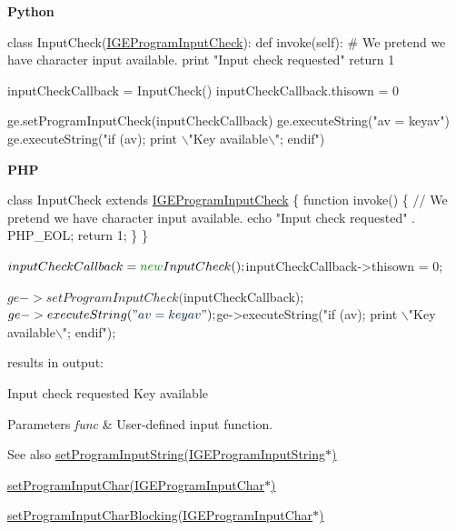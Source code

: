 {\bfseries Python} 
\begin{DoxyCode}
\textcolor{keyword}{class }InputCheck(\hyperlink{class_i_g_e_program_input_check}{IGEProgramInputCheck}):
    \textcolor{keyword}{def }invoke(self):
        \textcolor{comment}{# We pretend we have character input available.}
        \textcolor{keywordflow}{print} \textcolor{stringliteral}{"Input check requested"}
        \textcolor{keywordflow}{return} 1

inputCheckCallback = InputCheck()
inputCheckCallback.thisown = 0

ge.setProgramInputCheck(inputCheckCallback)
ge.executeString(\textcolor{stringliteral}{"av = keyav"})
ge.executeString(\textcolor{stringliteral}{"if (av); print \(\backslash\)"Key available\(\backslash\)"; endif"})
\end{DoxyCode}


{\bfseries P\+HP} 
\begin{DoxyCode}
\textcolor{keyword}{class }InputCheck \textcolor{keyword}{extends} \hyperlink{class_i_g_e_program_input_check}{IGEProgramInputCheck} \{
    \textcolor{keyword}{function} invoke() \{
        \textcolor{comment}{// We pretend we have character input available.}
        echo \textcolor{stringliteral}{"Input check requested"} . PHP\_EOL;
        \textcolor{keywordflow}{return} 1;
    \}
\}

$inputCheckCallback = \textcolor{keyword}{new} InputCheck();
$inputCheckCallback->thisown = 0;

$ge->setProgramInputCheck($inputCheckCallback);
$ge->executeString(\textcolor{stringliteral}{"av = keyav"});
$ge->executeString(\textcolor{stringliteral}{"if (av); print \(\backslash\)"Key available\(\backslash\)"; endif"});
\end{DoxyCode}
 results in output\+: 
\begin{DoxyCode}
Input check requested
Key available
\end{DoxyCode}



\begin{DoxyParams}{Parameters}
{\em func} & User-\/defined input function.\\
\hline
\end{DoxyParams}
\begin{DoxySeeAlso}{See also}
\hyperlink{class_g_a_u_s_s_ae82b5bfdf26971433c46936a812506c3}{set\+Program\+Input\+String(\+I\+G\+E\+Program\+Input\+String$\ast$)} 

\hyperlink{class_g_a_u_s_s_a71a60afb143ae00b18d6fe3fd99f316d}{set\+Program\+Input\+Char(\+I\+G\+E\+Program\+Input\+Char$\ast$)} 

\hyperlink{class_g_a_u_s_s_a300d6e33dbfd2a45f56ff2769f585435}{set\+Program\+Input\+Char\+Blocking(\+I\+G\+E\+Program\+Input\+Char$\ast$)} 
\end{DoxySeeAlso}
\mbox{\label{class_g_a_u_s_s_ae82b5bfdf26971433c46936a812506c3}} 

